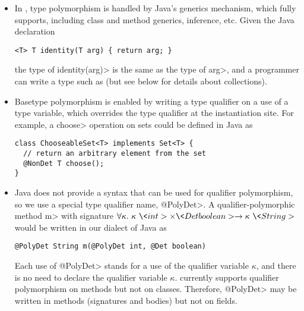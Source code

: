 \begin{itemize}
\item
In \theDeterminismCheckerImplementation,
type polymorphism is handled by Java's generics mechanism, which
\theDeterminismChecker fully supports, including class and method generics,
inference, etc.
Given the Java declaration
\begin{Verbatim}
<T> T identity(T arg) { return arg; }
\end{Verbatim}
the type of \<identity(arg)> is the same as the type of
\<arg>, and a programmer can write a type such as  (but see below for details about collections).
\item
Basetype polymorphism is enabled by writing a type qualifier on a use of a
type variable, which overrides the type qualifier at the instantiation
site.
For example, a \<choose> operation on sets could be defined in Java as
\begin{Verbatim}
class ChooseableSet<T> implements Set<T> {
  // return an arbitrary element from the set
  @NonDet T choose();
}
\end{Verbatim}
\item
Java does not provide a syntax that can be used for qualifier polymorphism,
so we use a special type qualifier name, \<@PolyDet>.
A qualifier-polymorphic method \<m> with signature $\forallt{\kappa} \kappa\ \<int> \times \<Det boolean> \rightarrow
\kappa\ \<String>$ would be written in our dialect of Java as
\begin{Verbatim}
@PolyDet String m(@PolyDet int, @Det boolean)
\end{Verbatim}
Each use of \<@PolyDet> stands for a use of the qualifier variable
$\kappa$, and there is no need to declare the qualifier variable $\kappa$.
\TheDeterminismChecker currently supports
qualifier
polymorphism on methods but not on classes.
Therefore, \<@PolyDet> may be written in methods (signatures and bodies)
but not on fields.
\end{itemize}





